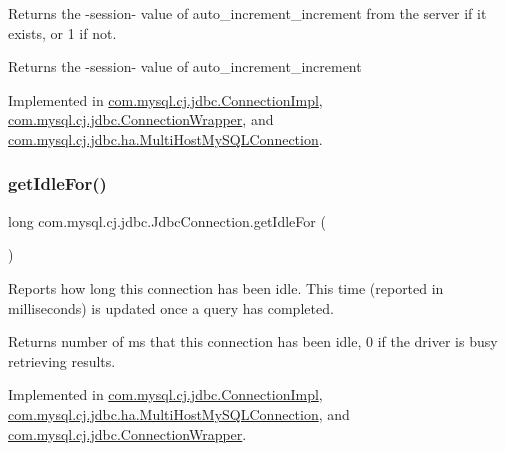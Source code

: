 Returns the -\/session-\/ value of \textquotesingle{}auto\+\_\+increment\+\_\+increment\textquotesingle{} from the server if it exists, or \textquotesingle{}1\textquotesingle{} if not.

\begin{DoxyReturn}{Returns}
the -\/session-\/ value of \textquotesingle{}auto\+\_\+increment\+\_\+increment\textquotesingle{} 
\end{DoxyReturn}


Implemented in \mbox{\hyperlink{classcom_1_1mysql_1_1cj_1_1jdbc_1_1_connection_impl_a47d3fb6ffbaaff0190ea15e3c35d7270}{com.\+mysql.\+cj.\+jdbc.\+Connection\+Impl}}, \mbox{\hyperlink{classcom_1_1mysql_1_1cj_1_1jdbc_1_1_connection_wrapper_a0855a0981bb14e92fee22c3591d95175}{com.\+mysql.\+cj.\+jdbc.\+Connection\+Wrapper}}, and \mbox{\hyperlink{classcom_1_1mysql_1_1cj_1_1jdbc_1_1ha_1_1_multi_host_my_s_q_l_connection_a94d28c91c18c2c57cd4ec7855a3d061d}{com.\+mysql.\+cj.\+jdbc.\+ha.\+Multi\+Host\+My\+S\+Q\+L\+Connection}}.

\mbox{\label{interfacecom_1_1mysql_1_1cj_1_1jdbc_1_1_jdbc_connection_a3a242d2fb1e6c443f163d55f8bbd6cde}} 
\subsubsection{\texorpdfstring{get\+Idle\+For()}{getIdleFor()}}
{\footnotesize\ttfamily long com.\+mysql.\+cj.\+jdbc.\+Jdbc\+Connection.\+get\+Idle\+For (\begin{DoxyParamCaption}{ }\end{DoxyParamCaption})}

Reports how long this connection has been idle. This time (reported in milliseconds) is updated once a query has completed.

\begin{DoxyReturn}{Returns}
number of ms that this connection has been idle, 0 if the driver is busy retrieving results. 
\end{DoxyReturn}


Implemented in \mbox{\hyperlink{classcom_1_1mysql_1_1cj_1_1jdbc_1_1_connection_impl_a628961d1155b35d0582a3198c2a6bb83}{com.\+mysql.\+cj.\+jdbc.\+Connection\+Impl}}, \mbox{\hyperlink{classcom_1_1mysql_1_1cj_1_1jdbc_1_1ha_1_1_multi_host_my_s_q_l_connection_a640187b96b3d091f9b74a927c754098c}{com.\+mysql.\+cj.\+jdbc.\+ha.\+Multi\+Host\+My\+S\+Q\+L\+Connection}}, and \mbox{\hyperlink{classcom_1_1mysql_1_1cj_1_1jdbc_1_1_connection_wrapper_a4894df9d353212ae8b4e0860c15e6a6e}{com.\+mysql.\+cj.\+jdbc.\+Connection\+Wrapper}}.


